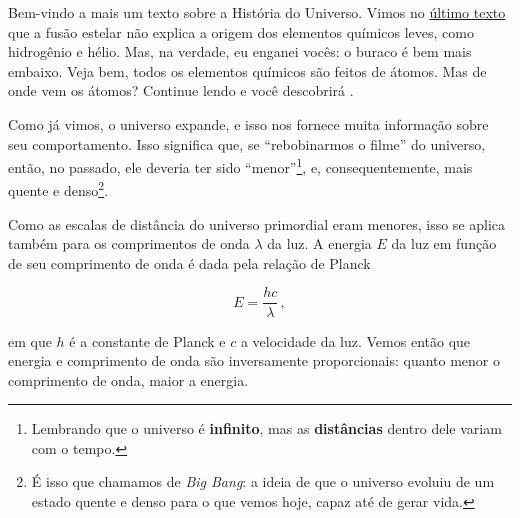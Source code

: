 \begin{multicols}{2} %
Bem-vindo a mais um texto sobre a História do Universo. Vimos no \href{https://drive.google.com/file/d/1D3q3ixp0qqPirSmoWL_jqtcO3WCsY0qJ/view}{último texto} que a fusão estelar não explica a origem dos elementos químicos leves, como hidrogênio e hélio. Mas, na verdade, eu enganei vocês: o buraco é bem mais embaixo. Veja bem, todos os elementos químicos são feitos de átomos. Mas de onde vem os átomos? Continue lendo e você descobrirá .

%

Como já vimos, o universo expande, e isso nos fornece muita informação sobre seu comportamento. Isso significa que, se ``rebobinarmos o filme'' do universo, então, no passado, ele deveria ter sido ``menor''\footnote{Lembrando que o universo é \textbf{infinito}, mas as \textbf{distâncias} dentro dele variam com o tempo.}, e, consequentemente, mais quente e denso\footnote{É isso que chamamos de \textit{Big Bang}: a ideia de que o universo evoluiu de um estado quente e denso para o que vemos hoje, capaz até de gerar vida.}.


Como as escalas de distância do universo primordial eram menores, isso se aplica também para os comprimentos de onda $\lambda$ da luz. A energia $E$ da luz em função de seu comprimento de onda é dada pela relação de Planck

\begin{equation}\label{Eq1}
    E = \frac{hc}{\lambda}\, ,
\end{equation}

\noindent em que $h$ é a constante de Planck e $c$ a velocidade da luz. Vemos então que energia e comprimento de onda são inversamente proporcionais: quanto menor o comprimento de onda, maior a energia. 



\end{multicols}
